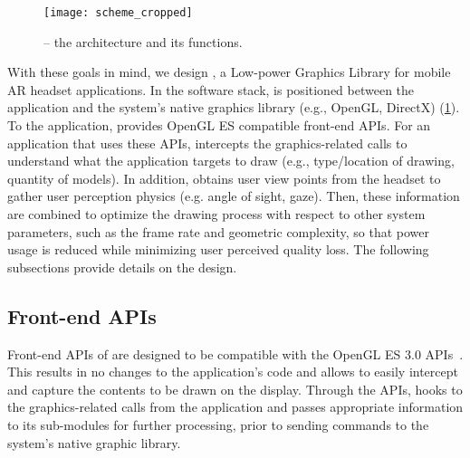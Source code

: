 \begin{figure}[t]
    \centering
    \vspace{-1ex}
    \texttt{[image: scheme\_cropped]}
    \vspace{-2ex}
    \caption{{\myit} -- 
           the architecture and its functions.}
    \label{fig:lpglDiagram}
\end{figure}

With these goals in mind, we design {\myit}, a Low-power Graphics Library
for mobile AR headset applications.
%
In the software stack, {\myit} is positioned between the application and the 
system's native graphics library (e.g., OpenGL, DirectX)
(\fig\ref{fig:lpglDiagram}).
%
To the application, {\myit} provides OpenGL ES compatible front-end APIs.
%
For an application that uses these APIs, {\myit} intercepts the 
graphics-related calls to understand what the application targets to draw
(e.g., type/location of drawing, quantity of models).
%
In addition, {\myit} obtains user view points from the headset to gather
user perception physics (e.g. angle of sight, gaze).
%
Then, these information are combined to optimize the drawing process with respect 
to other system parameters, such as the frame rate and geometric complexity, so
that power usage is reduced while minimizing user perceived quality loss.
%
The following subsections provide details on the {\myit} design.



\subsection{{\myit} Front-end APIs}

Front-end APIs of {\myit} are designed to be compatible with the OpenGL
ES 3.0 APIs~\cite{opengl}. 
%
This results in no changes to the application's code and allows {\myit} 
to easily intercept and capture the contents to be drawn on the display.
%
Through the APIs, {\myit} hooks to the graphics-related calls from the application
and passes appropriate information to its sub-modules for further processing, prior to sending commands to the system's native graphic library.
%



